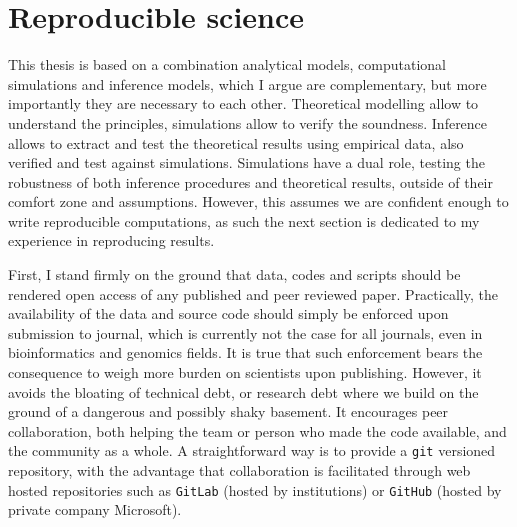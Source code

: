\section{Reproducible science}
\label{sec:reproducible-science}

This thesis is based on a combination analytical models, computational simulations and inference models, which I argue are complementary, but more importantly they are necessary to each other.
Theoretical modelling allow to understand the principles, simulations allow to verify the soundness.
Inference allows to extract and test the theoretical results using empirical data, also verified and test against simulations.
Simulations have a dual role, testing the robustness of both inference procedures and theoretical results, outside of their comfort zone and assumptions.
However, this assumes we are confident enough to write reproducible computations, as such the next section is dedicated to my experience in reproducing results.

First, I stand firmly on the ground that data, codes and scripts should be rendered open access of any published and peer reviewed paper.
Practically, the availability of the data and source code should simply be enforced upon submission to journal, which is currently not the case for all journals, even in bioinformatics and genomics fields.
It is true that such enforcement bears the consequence to weigh more burden on scientists upon publishing.
However, it avoids the bloating of technical debt, or research debt where we build on the ground of a dangerous and possibly shaky basement.
It encourages peer collaboration, both helping the team or person who made the code available, and the community as a whole.
A straightforward way is to provide a \texttt{git} versioned repository, with the advantage that collaboration is facilitated through web hosted repositories such as \texttt{GitLab} (hosted by institutions) or \texttt{GitHub} (hosted by private company Microsoft).


